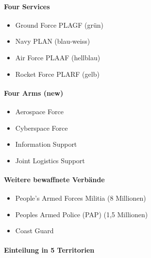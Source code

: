 {}\documentclass[a4paper]{article}
\providecommand{\tightlist}{\setlength{\itemsep}{1mm}\setlength{\parskip}{1mm}}
\begin{document}
\paragraph{Four Services}\label{four-services}

\begin{itemize}
	\tightlist
	\item
	      Ground Force PLAGF (grün)
	\item
	      Navy PLAN (blau-weiss)
	\item
	      Air Force PLAAF (hellblau)
	\item
	      Rocket Force PLARF (gelb)
\end{itemize}

\paragraph{Four Arms (new)}\label{four-arms-new}

\begin{itemize}
	\tightlist
	\item
	      Aerospace Force
	\item
	      Cyberspace Force
	\item
	      Information Support
	\item
	      Joint Logistics Support
\end{itemize}

\paragraph{Weitere bewaffnete
	Verbände}\label{weitere-bewaffnete-verbuxe4nde}

\begin{itemize}
	\tightlist
	\item
	      People's Armed Forces Militia (8 Millionen)
	\item
	      Peoples Armed Police (PAP) (1,5 Millionen)
	\item
	      Coast Guard
\end{itemize}

\paragraph{Einteilung in 5
	Territorien}\label{einteilung-in-5-territorien}
\end{document}
